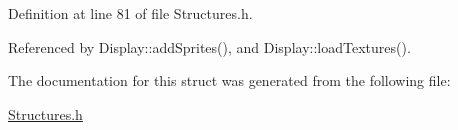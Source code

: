 Definition at line 81 of file Structures.\-h.



Referenced by Display\-::add\-Sprites(), and Display\-::load\-Textures().



The documentation for this struct was generated from the following file\-:\begin{DoxyCompactItemize}
\item 
\hyperlink{Structures_8h}{Structures.\-h}\end{DoxyCompactItemize}
